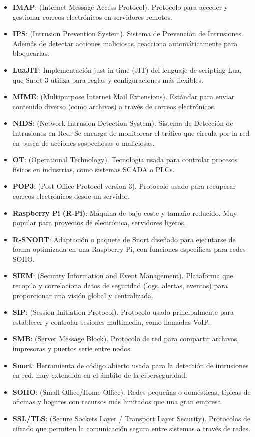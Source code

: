 \documentclass[11pt,a4paper,twoside]{report}
\begin{document}
\begin{itemize}
	\item \textbf{IMAP}: (Internet Message Access Protocol). Protocolo para acceder y gestionar correos electrónicos en servidores remotos.
	\item \textbf{IPS}: (Intrusion Prevention System). Sistema de Prevención de Intrusiones. Además de detectar acciones maliciosas, reacciona automáticamente para bloquearlas.
	\item \textbf{LuaJIT}: Implementación just-in-time (JIT) del lenguaje de scripting Lua, que Snort 3 utiliza para reglas y configuraciones más flexibles.
	\item \textbf{MIME}: (Multipurpose Internet Mail Extensions). Estándar para enviar contenido diverso (como archivos) a través de correos electrónicos.
	\item \textbf{NIDS}: (Network Intrusion Detection System). Sistema de Detección de Intrusiones en Red. Se encarga de monitorear el tráfico que circula por la red en busca de acciones sospechosas o maliciosas.
	\item \textbf{OT}: (Operational Technology). Tecnología usada para controlar procesos físicos en industrias, como sistemas SCADA o PLCs.
	\item \textbf{POP3}: (Post Office Protocol version 3). Protocolo usado para recuperar correos electrónicos desde un servidor.
	\item \textbf{Raspberry Pi (R-Pi)}: Máquina de bajo coste y tamaño reducido. Muy popular para proyectos de electrónica, servidores ligeros.
	\item \textbf{R-SNORT}: Adaptación o paquete de Snort diseñado para ejecutarse de forma optimizada en una Raspberry Pi, con funciones específicas para redes SOHO.
	\item \textbf{SIEM}: (Security Information and Event Management). Plataforma que recopila y correlaciona datos de seguridad (logs, alertas, eventos) para proporcionar una visión global y centralizada.
	\item \textbf{SIP}: (Session Initiation Protocol). Protocolo usado principalmente para establecer y controlar sesiones multimedia, como llamadas VoIP.
	\item \textbf{SMB}: (Server Message Block). Protocolo de red para compartir archivos, impresoras y puertos serie entre nodos.
	\item \textbf{Snort}: Herramienta de código abierto usada para la detección de intrusiones en red, muy extendida en el ámbito de la ciberseguridad.
	\item \textbf{SOHO}: (Small Office/Home Office). Redes pequeñas o domésticas, típicas de oficinas y hogares con recursos más limitados que una gran empresa.
	\item \textbf{SSL/TLS}: (Secure Sockets Layer / Transport Layer Security). Protocolos de cifrado que permiten la comunicación segura entre sistemas a través de redes.
\end{itemize}
\end{document}

